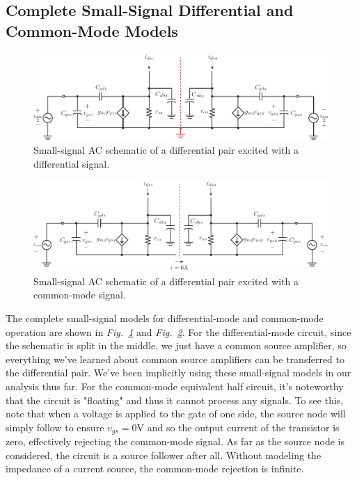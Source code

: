 \subsection{Complete Small-Signal Differential and Common-Mode Models}
\begin{figure}[tb]
\centering
\includegraphics[width=\columnwidth]{DM_symmetry_small_signal.pdf}
\caption{Small-signal AC schematic of a differential pair excited with a differential signal.} \label{fig:DM_symmetry_small_signal.pdf}
\end{figure}
\begin{figure}[tb]
\centering
\includegraphics[width=\columnwidth]{CM_symmetry_small_signal.pdf}
\caption{Small-signal AC schematic of a differential pair excited with a common-mode signal.} \label{fig:CM_symmetry_small_signal.pdf}
\end{figure}
The complete small-signal models for differential-mode and common-mode operation are shown in \emph{Fig.~\ref{fig:DM_symmetry_small_signal.pdf}} and \emph{Fig.~\ref{fig:CM_symmetry_small_signal.pdf}}.  For the differential-mode circuit, since the schematic is split in the middle, we just have a common source amplifier, so everything we've learned about common source amplifiers can be transferred to the differential pair.  We've been implicitly using these small-signal models in our analysis thus far.  For the common-mode equivalent half circuit, it's noteworthy that the circuit is "floating" and thus it cannot process any signals.  To see this, note that when a voltage is applied to the gate of one side, the source node will simply follow to ensure $v_{gs} = 0$V and so the output current of the transistor is zero, effectively rejecting the common-mode signal.  As far as the source node is considered, the circuit is a source follower after all.  Without modeling the impedance of a current source, the common-mode rejection is infinite.
